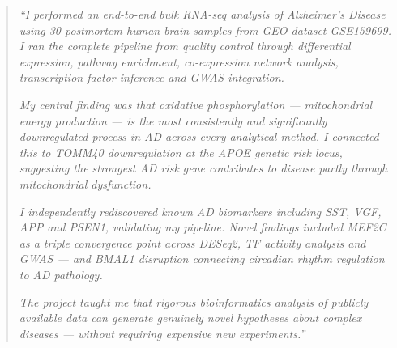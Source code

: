 \documentclass[
]{article}
\begin{document}
\begin{quote}
\emph{``I performed an end-to-end bulk RNA-seq analysis of Alzheimer's
Disease using 30 postmortem human brain samples from GEO dataset
GSE159699. I ran the complete pipeline from quality control through
differential expression, pathway enrichment, co-expression network
analysis, transcription factor inference and GWAS integration.}

\emph{My central finding was that oxidative phosphorylation ---
mitochondrial energy production --- is the most consistently and
significantly downregulated process in AD across every analytical
method. I connected this to TOMM40 downregulation at the APOE genetic
risk locus, suggesting the strongest AD risk gene contributes to disease
partly through mitochondrial dysfunction.}

\emph{I independently rediscovered known AD biomarkers including SST,
VGF, APP and PSEN1, validating my pipeline. Novel findings included
MEF2C as a triple convergence point across DESeq2, TF activity analysis
and GWAS --- and BMAL1 disruption connecting circadian rhythm regulation
to AD pathology.}

\emph{The project taught me that rigorous bioinformatics analysis of
publicly available data can generate genuinely novel hypotheses about
complex diseases --- without requiring expensive new experiments.''}
\end{quote}
\end{document}
